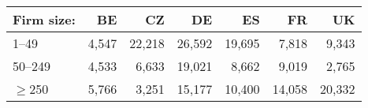 \begin{tabular}{lrrrrrr}
\toprule
Firm size: & BE   & CZ    & DE    & ES    & FR    & UK    \\
\midrule
1--49       & 4,547 & 22,218  & 26,592 & 19,695 &  7,818 &  9,343 \\
50--249     & 4,533 &  6,633  & 19,021 &  8,662 &  9,019 &  2,765 \\
$\geq$250    & 5,766 &  3,251  & 15,177 & 10,400 & 14,058 & 20,332 \\
\bottomrule
\end{tabular}

